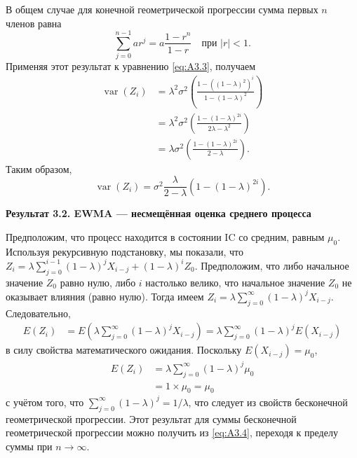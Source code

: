 В общем случае для конечной геометрической прогрессии сумма первых \(n\) членов равна
\begin{equation}
	\sum_{j=0}^{n-1} a r^j = a\frac{1 - r^n}{1 - r} \quad \text{при } |r| < 1.
	\tag{A3.4}
	\label{eq:A3.4}
\end{equation}
Применяя этот результат к уравнению \eqref{eq:A3.3}, получаем
\[
\begin{aligned}
	\operatorname{var}(Z_i)
	&= \lambda^2 \sigma^2 \left(\frac{1 - ((1 - \lambda)^2)^i}{1 - (1 - \lambda)^2}\right) \\
	&= \lambda^2 \sigma^2 \left(\frac{1 - (1 - \lambda)^{2i}}{2\lambda - \lambda^2}\right) \\
	&= \lambda \sigma^2 \left(\frac{1 - (1 - \lambda)^{2i}}{2 - \lambda}\right).
\end{aligned}
\]
Таким образом,
\begin{equation}
	\operatorname{var}(Z_i) = \sigma^2 \frac{\lambda}{2 - \lambda}\left(1 - (1 - \lambda)^{2i}\right).
	\tag{A3.5}
	\label{eq:A3.5}
\end{equation}

\noindent\textbf{Результат 3.2. EWMA — несмещённая оценка среднего процесса}

Предположим, что процесс находится в состоянии IC со средним, равным \(\mu_0\). Используя рекурсивную подстановку, мы показали, что \(Z_i = \lambda \sum_{j=0}^{i-1}(1 - \lambda)^j X_{i-j} + (1 - \lambda)^i Z_0\). Предположим, что либо начальное значение \(Z_0\) равно нулю, либо \(i\) настолько велико, что начальное значение \(Z_0\) не оказывает влияния (равно нулю). Тогда имеем \(Z_i = \lambda \sum_{j=0}^{\infty}(1 - \lambda)^j X_{i-j}\). Следовательно,
\[
\begin{aligned}
	E(Z_i) &= E\left(\lambda \sum_{j=0}^{\infty}(1 - \lambda)^j X_{i-j}\right)
	       = \lambda \sum_{j=0}^{\infty}(1 - \lambda)^j E(X_{i-j})
\end{aligned}
\]
в силу свойства математического ожидания. Поскольку \(E(X_{i-j}) = \mu_0\),
\[
\begin{aligned}
	E(Z_i) &= \lambda \sum_{j=0}^{\infty}(1 - \lambda)^j \mu_0 \\
	       &= 1 \times \mu_0 = \mu_0
\end{aligned}
\]
с учётом того, что \(\sum_{j=0}^{\infty}(1 - \lambda)^j = 1/\lambda\), что следует из свойств бесконечной геометрической прогрессии. Этот результат для суммы бесконечной геометрической прогрессии можно получить из \eqref{eq:A3.4}, переходя к пределу суммы при \(n \to \infty\).

